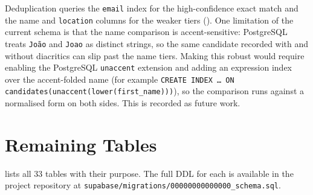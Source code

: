 Deduplication queries the \texttt{email} index for the high-confidence exact
match and the name and \texttt{location} columns for the weaker tiers
(). One limitation of the current schema is that the
name comparison is accent-sensitive: PostgreSQL treats \texttt{Jo\~ao} and
\texttt{Joao} as distinct strings, so the same candidate recorded with and
without diacritics can slip past the name tiers. Making this robust would
require enabling the PostgreSQL \texttt{unaccent} extension and adding an
expression index over the accent-folded name (for example
\texttt{CREATE INDEX \dots\ ON candidates(unaccent(lower(first\_name)))}), so
the comparison runs against a normalised form on both sides. This is recorded
as future work.

\section{Remaining Tables}
\label{app:db-tables}

 lists all 33 tables with their
purpose. The full DDL for each is available in the project repository at
\texttt{supabase/migrations/00000000000000\_schema.sql}.

